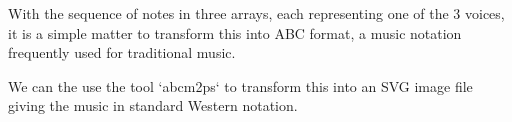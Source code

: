 \begin{tcolorbox}[%
  breakable,
  parbox = false,
  frame hidden,
  sharp corners,
  after skip=10pt,
  overlay broken = {
    \draw[]
      (frame.north west) rectangle (frame.south east);},
]{}
With the sequence of notes in three arrays, each representing one of the 3 voices, it is a simple
matter to transform this into ABC format, a music notation frequently used for traditional music.



We can the use the tool `abcm2ps` to transform this into an SVG image file giving the music in
standard Western notation.
\end{tcolorbox}%


